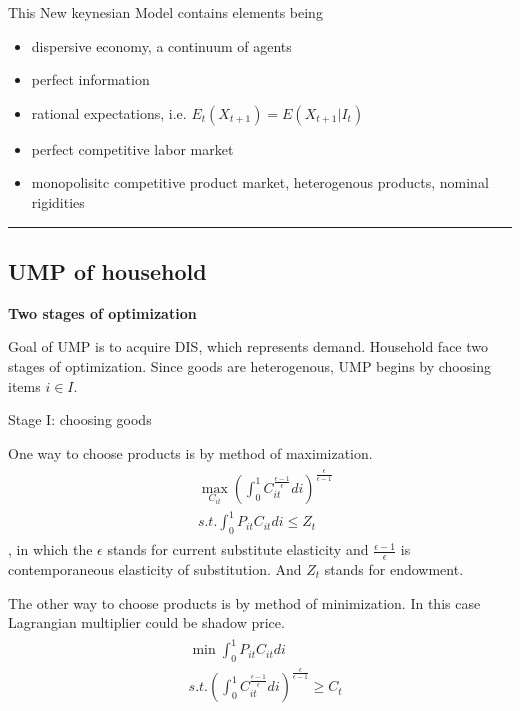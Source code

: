 \documentclass{article}
\providecommand{\tightlist}{
  \setlength{\itemsep}{0pt}
  \setlength{\parskip}{0pt}}
\newcommand*\sepline{%
  \begin{center}
    \rule[1ex]{.5\textwidth}{.5pt}
  \end{center}}
\begin{document}
This New keynesian Model contains elements being 
\begin{itemize}
\tightlist
  \item dispersive economy, a continuum of agents
  \item perfect information 
  \item rational expectations, i.e. $E_t(X_{t+1})=E(X_{t+1}|I_t)$
  \item perfect competitive labor market 
  \item monopolisitc competitive product market, heterogenous products, nominal rigidities
\end{itemize}



\sepline
\subsection{UMP of household} 

\textbf{Two stages of optimization}

Goal of UMP is to acquire DIS, which represents demand. Household face two stages of optimization. Since goods are heterogenous, UMP begins by choosing items $i\in I$.

Stage I: choosing goods

One way to choose products is by method of maximization.
\begin{align}
\begin{split}
&\max\limits_{C_{it}} ( \int_{0}^{1}C_{it}^{\frac{\epsilon-1}{\epsilon}}di)^{\frac{\epsilon}{\epsilon-1}} 
\\&s.t. \int_{0}^{1} P_{it}C_{it}di \leqslant Z_{t}
\end{split}
\end{align}
, in which the $\epsilon$ stands for current substitute elasticity and $\frac{\epsilon-1}{\epsilon}$ is contemporaneous elasticity of substitution. And $Z_t$ stands for endowment.

The other way to choose products is by method of minimization. In this case Lagrangian multiplier could be shadow price.
\begin{align}
\begin{split}
& \min \int_{0}^{1} P_{it}C_{it}di
\\& s.t. (\int_{0}^{1}C_{it}^{\frac{\epsilon-1}{\epsilon}}di)^{\frac{\epsilon}{\epsilon-1}} \geqslant C_{t}
\end{split}
\end{align}
\end{document}
